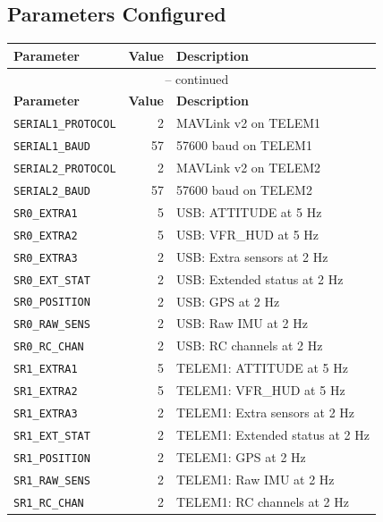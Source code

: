 \documentclass[11pt,a4paper]{article}
\begin{document}
\subsection{Parameters Configured}

\begin{longtable}{@{}p{4.5cm}rp{7.5cm}@{}}
    \toprule
    \textbf{Parameter} & \textbf{Value} & \textbf{Description} \\
    \midrule
    \endfirsthead
    \multicolumn{3}{c}{{\tablename~\thetable{} -- continued}} \\
    \toprule
    \textbf{Parameter} & \textbf{Value} & \textbf{Description} \\
    \midrule
    \endhead
    \bottomrule
    \endlastfoot

    \texttt{SERIAL1\_PROTOCOL} & 2   & MAVLink v2 on TELEM1 \\
    \texttt{SERIAL1\_BAUD}     & 57  & 57600 baud on TELEM1 \\
    \texttt{SERIAL2\_PROTOCOL} & 2   & MAVLink v2 on TELEM2 \\
    \texttt{SERIAL2\_BAUD}     & 57  & 57600 baud on TELEM2 \\
    \midrule
    \texttt{SR0\_EXTRA1}       & 5   & USB: ATTITUDE at 5 Hz \\
    \texttt{SR0\_EXTRA2}       & 5   & USB: VFR\_HUD at 5 Hz \\
    \texttt{SR0\_EXTRA3}       & 2   & USB: Extra sensors at 2 Hz \\
    \texttt{SR0\_EXT\_STAT}    & 2   & USB: Extended status at 2 Hz \\
    \texttt{SR0\_POSITION}     & 2   & USB: GPS at 2 Hz \\
    \texttt{SR0\_RAW\_SENS}    & 2   & USB: Raw IMU at 2 Hz \\
    \texttt{SR0\_RC\_CHAN}      & 2   & USB: RC channels at 2 Hz \\
    \midrule
    \texttt{SR1\_EXTRA1}       & 5   & TELEM1: ATTITUDE at 5 Hz \\
    \texttt{SR1\_EXTRA2}       & 5   & TELEM1: VFR\_HUD at 5 Hz \\
    \texttt{SR1\_EXTRA3}       & 2   & TELEM1: Extra sensors at 2 Hz \\
    \texttt{SR1\_EXT\_STAT}    & 2   & TELEM1: Extended status at 2 Hz \\
    \texttt{SR1\_POSITION}     & 2   & TELEM1: GPS at 2 Hz \\
    \texttt{SR1\_RAW\_SENS}    & 2   & TELEM1: Raw IMU at 2 Hz \\
    \texttt{SR1\_RC\_CHAN}      & 2   & TELEM1: RC channels at 2 Hz \\
\end{longtable}
\end{document}
